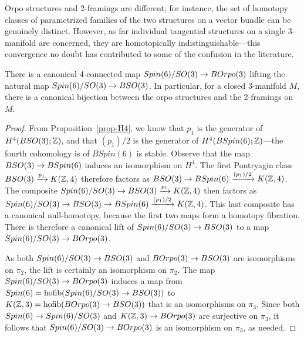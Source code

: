 \documentclass{amsart}
\begin{document}
Orpo structures and 2-framings are different; for instance, the set of homotopy classes of parametrized families of the two structures on a vector bundle can be genuinely distinct.  However, as far individual tangential structures on a single 3-manifold are concerned, they are homotopically indistinguishable---this convergence no doubt has contributed to some of the confusion in the literature.
\begin{proposition}
There is a canonical 4-connected map $Spin(6)/SO(3) \rightarrow BOrpo(3)$ lifting the natural map $Spin(6)/SO(3) \rightarrow BSO(3)$.  In particular, for a closed 3-manifold $M$, there is a canonical bijection between the orpo structures and the 2-framings on $M$. 
\end{proposition}
\begin{proof}
From Proposition~\ref{prop-H4}, we know that $p_1$ is the generator of $H^4(BSO(3);\mathbb Z)$, and that $(p_1)/2$ is the generator of $H^4(BSpin(6);\mathbb Z)$---the fourth cohomology is of $BSpin(6)$ is stable.  Observe that the map $BSO(3) \rightarrow BSpin(6)$ induces an isomorphism on $H^4$.  The first Pontryagin class $BSO(3) \xrightarrow{p_1} K(\mathbb Z,4)$ therefore factors as $BSO(3) \rightarrow BSpin(6) \xrightarrow{(p_1)/2} K(\mathbb Z,4)$.  The composite $Spin(6)/SO(3) \rightarrow BSO(3) \xrightarrow{p_1} K(\mathbb Z,4)$ then factors as $Spin(6)/SO(3) \rightarrow BSO(3) \rightarrow BSpin(6) \xrightarrow{(p_1)/2} K(\mathbb Z,4)$.  This last composite has a canonical null-homotopy, because the first two maps form a homotopy fibration.  There is therefore a canonical lift of $Spin(6)/SO(3) \rightarrow BSO(3)$ to a map $Spin(6)/SO(3) \rightarrow BOrpo(3)$.

As both $Spin(6)/SO(3) \rightarrow BSO(3)$ and $BOrpo(3) \rightarrow BSO(3)$ are isomorphisms on $\pi_2$, the lift is certainly an isomorphism on $\pi_2$.  The map $Spin(6)/SO(3) \rightarrow BOrpo(3)$ induces a map from $Spin(6) = \operatorname{hofib}(Spin(6)/SO(3) \rightarrow BSO(3))$ to $K(\mathbb Z,3) = \operatorname{hofib}(BOrpo(3) \rightarrow BSO(3))$ that is an isomorphisms on $\pi_3$.  Since both $Spin(6) \rightarrow Spin(6)/SO(3)$ and $K(\mathbb Z,3) \rightarrow BOrpo(3)$ are surjective on $\pi_3$, it follows that $Spin(6)/SO(3) \rightarrow BOrpo(3)$ is an isomorphism on $\pi_3$, as needed.
\end{proof} %
\end{document}
